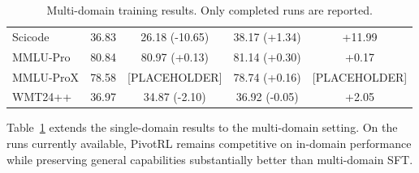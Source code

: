 \begin{table}[t]
\begin{tabular}{l c cc c}
Scicode 
& 36.83 
& 26.18 (-10.65) & 38.17 (+1.34) 
& +11.99 \\

MMLU-Pro 
& 80.84 
& 80.97 (+0.13)  & 81.14 (+0.30) 
& +0.17 \\

MMLU-ProX 
& 78.58 
& [PLACEHOLDER]  & 78.74 (+0.16) 
& [PLACEHOLDER] \\

WMT24++ 
& 36.97 
& 34.87 (-2.10)  & 36.92 (-0.05) 
& +2.05 \\

\bottomrule
\end{tabular}
\caption{
Multi-domain training results.
Only completed runs are reported.
}
\label{tab:multi_domain_results}
\end{table}

Table~\ref{tab:multi_domain_results} extends the single-domain results to the multi-domain setting. On the runs currently available, PivotRL remains competitive on in-domain performance while preserving general capabilities substantially better than multi-domain SFT.